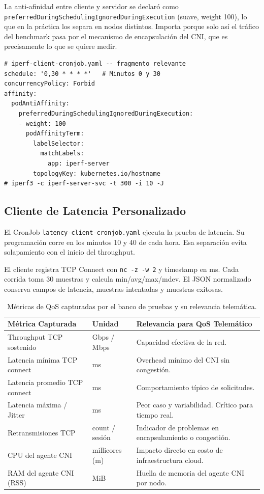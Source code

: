 La anti-afinidad entre cliente y servidor se declaró como \texttt{preferredDuringScheduling\allowbreak IgnoredDuringExecution} (suave, weight 100), lo que en la práctica los separa en nodos distintos. Importa porque solo así el tráfico del benchmark pasa por el mecanismo de encapsulación del CNI, que es precisamente lo que se quiere medir.

\begin{lstlisting}
# iperf-client-cronjob.yaml -- fragmento relevante
schedule: '0,30 * * * *'   # Minutos 0 y 30
concurrencyPolicy: Forbid
affinity:
  podAntiAffinity:
    preferredDuringSchedulingIgnoredDuringExecution:
    - weight: 100
      podAffinityTerm:
        labelSelector:
          matchLabels:
            app: iperf-server
        topologyKey: kubernetes.io/hostname
# iperf3 -c iperf-server-svc -t 300 -i 10 -J
\end{lstlisting}

\subsection{Cliente de Latencia Personalizado}

El CronJob \texttt{latency-client-cronjob.yaml} ejecuta la prueba de latencia. Su programación corre en los minutos 10 y 40 de cada hora. Esa separación evita solapamiento con el inicio del throughput.

El cliente registra TCP Connect con \texttt{nc -z -w 2} y timestamp en ms. Cada corrida toma 30 muestras y calcula min/avg/max/mdev. El JSON normalizado conserva campos de latencia, muestras intentadas y muestras exitosas.

\begin{table}[htbp]
\centering
\scriptsize
\renewcommand{\arraystretch}{1.25}
\setlength{\tabcolsep}{4pt}
\caption{Métricas de QoS capturadas por el banco de pruebas y su relevancia telemática.}
\label{tab:metricas-qos-implementacion}
\begin{tabularx}{\textwidth}{|p{4cm}|p{2.4cm}|Y|}
\hline
\textbf{Métrica Capturada} & \textbf{Unidad} & \textbf{Relevancia para QoS Telemático} \\
\hline
Throughput TCP sostenido & Gbps / Mbps & Capacidad efectiva de la red. \\
\hline
Latencia mínima TCP connect & ms & Overhead mínimo del CNI sin congestión. \\
\hline
Latencia promedio TCP connect & ms & Comportamiento típico de solicitudes. \\
\hline
Latencia máxima / Jitter & ms & Peor caso y variabilidad. Crítico para tiempo real. \\
\hline
Retransmisiones TCP & count / sesión & Indicador de problemas en encapsulamiento o congestión. \\
\hline
CPU del agente CNI & millicores (m) & Impacto directo en costo de infraestructura cloud. \\
\hline
RAM del agente CNI (RSS) & MiB & Huella de memoria del agente CNI por nodo. \\
\hline
\end{tabularx}
\end{table}

